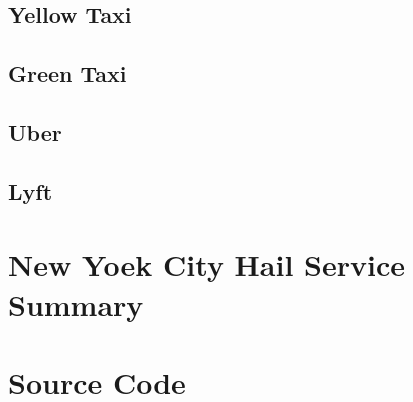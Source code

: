 \documentclass[12pt,twoside]{reedthesis}
\theoremstyle{definition}
\theoremstyle{definition}
\theoremstyle{definition}
\theoremstyle{remark}
\begin{document}
\subsection{Yellow Taxi}\label{yellow-taxi-5}

\subsection{Green Taxi}\label{green-taxi-5}

\subsection{Uber}\label{uber-5}

\subsection{Lyft}\label{lyft-5}

\section{New Yoek City Hail Service
Summary}\label{new-yoek-city-hail-service-summary}

\section{Source Code}\label{source-code}
\end{document}
